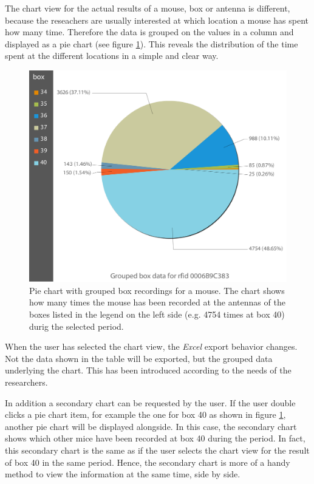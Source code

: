 The chart view for the actual results of a mouse, box or antenna is different, because the reseachers are usually interested at which location a mouse has spent how many time. Therefore the data is grouped on the values in a column and displayed as a pie chart (see figure \ref{fig:pie_chart_for_mouse}). This reveals the distribution of the time spent at the different locations in a simple and clear way. 

\begin{figure}[htpb]
\begin{center}
  \includegraphics[width=.66\textwidth]{assets/img/pie_chart_for_mouse.png}
  \caption[Pie chart of result data for a mouse]{Pie chart with grouped box recordings for a mouse. The chart shows how many times the mouse has been recorded at the antennas of the boxes listed in the legend on the left side (e.g. 4754 times at box 40) durig the selected period.}
  \label{fig:pie_chart_for_mouse}
\end{center}
\end{figure}

When the user has selected the chart view, the \textit{Excel} export behavior changes. Not the data shown in the table will be exported, but the grouped data underlying the chart. This has been introduced according to the needs of the researchers.

In addition a secondary chart can be requested by the user. If the user double clicks a pie chart item, for example the one for box 40 as shown in figure \ref{fig:pie_chart_for_mouse}, another pie chart will be displayed alongside. In this case, the secondary chart shows which other mice have been recorded at box 40 during the period. In fact, this secondary chart is the same as if the user selects the chart view for the result of box 40 in the same period. Hence, the secondary chart is more of a handy method to view the information at the same time, side by side.

